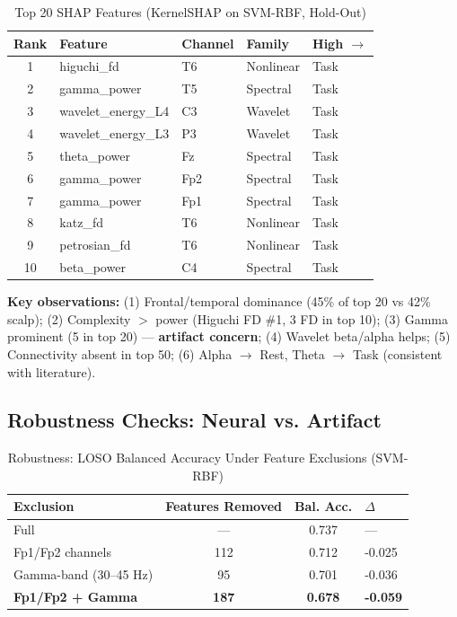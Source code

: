 \documentclass[conference]{IEEEtran}
\begin{document}
\begin{table}[htbp]
\caption{Top 20 SHAP Features (KernelSHAP on SVM-RBF, Hold-Out)}
\label{tab:shap}
\centering
\begin{tabular}{@{}cllll@{}}
\toprule
Rank & Feature & Channel & Family & High $\rightarrow$ \\
\midrule
1 & higuchi\_fd & T6 & Nonlinear & Task \\
2 & gamma\_power & T5 & Spectral & Task \\
3 & wavelet\_energy\_L4 & C3 & Wavelet & Task \\
4 & wavelet\_energy\_L3 & P3 & Wavelet & Task \\
5 & theta\_power & Fz & Spectral & Task \\
6 & gamma\_power & Fp2 & Spectral & Task \\
7 & gamma\_power & Fp1 & Spectral & Task \\
8 & katz\_fd & T6 & Nonlinear & Task \\
9 & petrosian\_fd & T6 & Nonlinear & Task \\
10 & beta\_power & C4 & Spectral & Task \\
\bottomrule
\end{tabular}
\end{table}

\textbf{Key observations:} (1) Frontal/temporal dominance (45\% of top 20 vs 42\% scalp); (2) Complexity $>$ power (Higuchi FD \#1, 3 FD in top 10); (3) Gamma prominent (5 in top 20) — \textbf{artifact concern}; (4) Wavelet beta/alpha helps; (5) Connectivity absent in top 50; (6) Alpha $\rightarrow$ Rest, Theta $\rightarrow$ Task (consistent with literature).

\subsection{Robustness Checks: Neural vs. Artifact}

\begin{table}[htbp]
\caption{Robustness: LOSO Balanced Accuracy Under Feature Exclusions (SVM-RBF)}
\label{tab:robust}
\centering
\begin{tabular}{@{}lcc@{}}
\toprule
Exclusion & Features Removed & Bal. Acc. & $\Delta$ \\
\midrule
Full & — & 0.737 & — \\
Fp1/Fp2 channels & 112 & 0.712 & -0.025 \\
Gamma-band (30–45 Hz) & 95 & 0.701 & -0.036 \\
\textbf{Fp1/Fp2 + Gamma} & \textbf{187} & \textbf{0.678} & \textbf{-0.059} \\
\bottomrule
\end{tabular}
\end{table}
\end{document}
